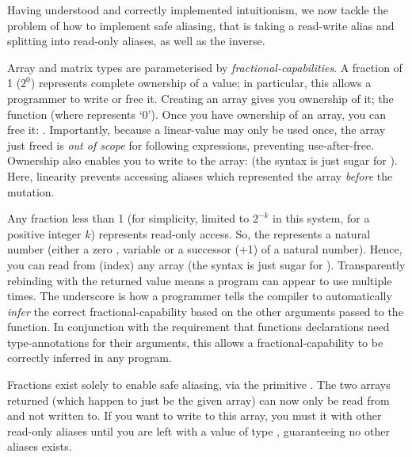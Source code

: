 Having understood and correctly implemented intuitionism, we now tackle
the problem of how to implement safe aliasing, that is taking a read-write
alias and splitting into read-only aliases, as well as the inverse.

Array and matrix types are parameterised by \emph{fractional-capabilities}.  A
fraction of 1 ($2^0$) represents complete ownership of a value; in particular,
this allows a programmer to write or free it. Creating an array gives you
ownership of it; the function  (where 
represents `0'). Once you have ownership of an array, you can free it:
.  Importantly, because a linear-value may only be
used once, the array just freed is \emph{out of scope} for following
expressions, preventing use-after-free.  Ownership also enables you to write to
the array:  (the syntax
 is just sugar for ). Here, linearity
prevents accessing aliases which represented the array \emph{before} the
mutation.

Any fraction less than 1 (for simplicity, limited to $2^{-k}$ in this system,
for a positive integer $k$) represents read-only access. So, the 
represents a natural number (either a zero , variable  or a
successor (+1) of a natural number). Hence, you can read from (index) any array
 (the syntax  is just sugar for ). Transparently
rebinding  with the returned value means a program can appear to use
 multiple times. The underscore is how a programmer tells the compiler
to automatically \emph{infer} the correct fractional-capability based on the
other arguments passed to the function. In conjunction with the requirement
that functions declarations need type-annotations for their arguments, this
allows a fractional-capability to be correctly inferred in any program.

Fractions exist solely to enable safe aliasing, via the primitive .  The two arrays returned (which happen
to just be the given array) can now only be read from and not written to.  If
you want to write to this array, you must  it with other read-only aliases until you are left with a
value of type , guaranteeing no other aliases exists.


